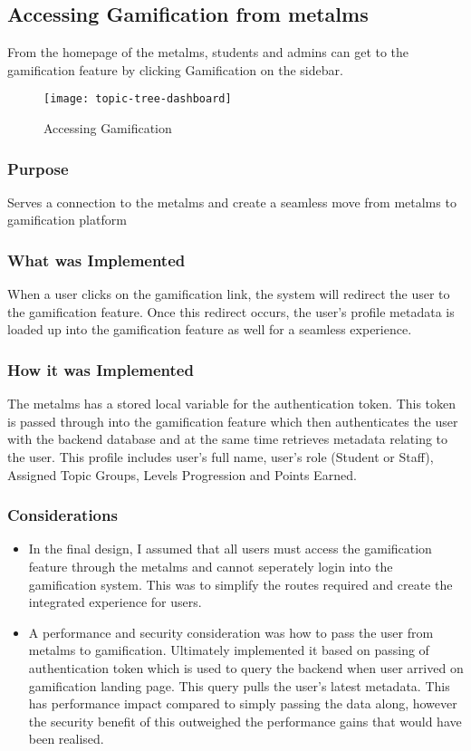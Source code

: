 \newpage

\subsection{Accessing Gamification from metalms}
From the homepage of the metalms, students and admins can get to the gamification feature by clicking Gamification on the sidebar.

\begin{figure}[h!]
\texttt{[image: topic-tree-dashboard]}
    \centering
    \caption{Accessing Gamification}
\end{figure}


\subsubsection{Purpose}
Serves a connection to the metalms and create a seamless move from metalms to gamification platform

\subsubsection{What was Implemented}
When a user clicks on the gamification link, the system will redirect the user to the gamification feature. Once this redirect occurs, the user's profile metadata is loaded up into the gamification feature as well for a seamless experience.

\newpage

\subsubsection{How it was Implemented}
The metalms has a stored local variable for the authentication token. This token is passed through into the gamification feature which then authenticates the user with the backend database and at the same time retrieves metadata relating to the user. This profile includes user's full name, user's role (Student or Staff), Assigned Topic Groups, Levels Progression and Points Earned. 

\subsubsection{Considerations}
\begin{itemize}
    \item In the final design, I assumed that all users must access the gamification feature through the metalms and cannot seperately login into the gamification system. This was to simplify the routes required and create the integrated experience for users.
    \item A performance and security consideration was how to pass the user from metalms to gamification. Ultimately implemented it based on passing of authentication token which is used to query the backend when user arrived on gamification landing page. This query pulls the user's latest metadata. This has performance impact compared to simply passing the data along, however the security benefit of this outweighed the performance gains that would have been realised.
\end{itemize}

